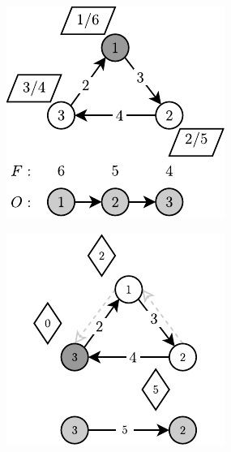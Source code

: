 \begin{figure}[!htbp]
	\centering
	\null\hfill
	\begin{subfigure}[b]{0.25\textwidth}
		\includegraphics[width=\textwidth]{Chapter_II/BFS-TOPOLOGICAL-SORT-Example/a.pdf}
		\caption{}
		\label{fig:exampleDFS:a}
	\end{subfigure}%
	\hfill
	\begin{subfigure}[b]{0.25\textwidth}
		\includegraphics[width=\textwidth]{Chapter_II/BFS-TOPOLOGICAL-SORT-Example/b.pdf}

\end{subfigure}
\end{figure}
